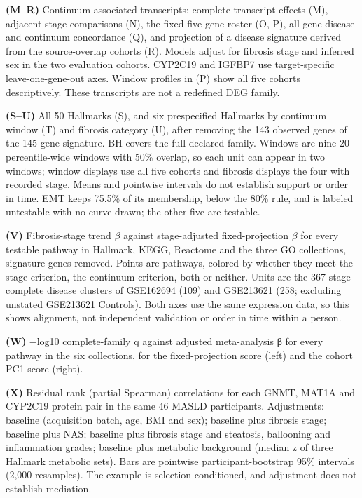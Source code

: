 \textbf{(M--R)} Continuum-associated transcripts: complete transcript effects (M), adjacent-stage comparisons (N), the fixed five-gene roster (O, P), all-gene disease and continuum concordance (Q), and projection of a disease signature derived from the source-overlap cohorts (R). Models adjust for fibrosis stage and inferred sex in the two evaluation cohorts. CYP2C19 and IGFBP7 use target-specific leave-one-gene-out axes. Window profiles in (P) show all five cohorts descriptively. These transcripts are not a redefined DEG family.

\textbf{(S--U)} All 50 Hallmarks (S), and six prespecified Hallmarks by continuum window (T) and fibrosis category (U), after removing the 143 observed genes of the 145-gene signature. BH covers the full declared family. Windows are nine 20-percentile-wide windows with 50\% overlap, so each unit can appear in two windows; window displays use all five cohorts and fibrosis displays the four with recorded stage. Means and pointwise intervals do not establish support or order in time. EMT keeps 75.5\% of its membership, below the 80\% rule, and is labeled untestable with no curve drawn; the other five are testable.

\textbf{(V)} Fibrosis-stage trend $\beta$ against stage-adjusted fixed-projection $\beta$ for every testable pathway in Hallmark, KEGG, Reactome and the three GO collections, signature genes removed. Points are pathways, colored by whether they meet the stage criterion, the continuum criterion, both or neither. Units are the 367 stage-complete disease clusters of GSE162694 (109) and GSE213621 (258; excluding unstated GSE213621 Controls). Both axes use the same expression data, so this shows alignment, not independent validation or order in time within a person.

\textbf{(W)} −log10 complete-family q against adjusted meta-analysis β for every pathway in the six collections, for the fixed-projection score (left) and the cohort PC1 score (right).

\textbf{(X)} Residual rank (partial Spearman) correlations for each GNMT, MAT1A and CYP2C19 protein pair in the same 46 MASLD participants. Adjustments: baseline (acquisition batch, age, BMI and sex); baseline plus fibrosis stage; baseline plus NAS; baseline plus fibrosis stage and steatosis, ballooning and inflammation grades; baseline plus metabolic background (median z of three Hallmark metabolic sets). Bars are pointwise participant-bootstrap 95\% intervals (2,000 resamples). The example is selection-conditioned, and adjustment does not establish mediation.

